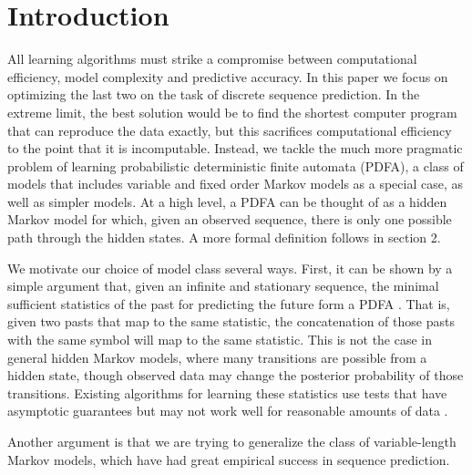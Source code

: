 \section{Introduction}
All learning algorithms must strike a compromise between computational efficiency, model complexity and predictive accuracy.  In this paper we focus on optimizing the last two on the task of discrete sequence prediction.  In the extreme limit, the best solution would be to find the shortest computer program that can reproduce the data exactly, but this sacrifices computational efficiency to the point that it is incomputable.  Instead, we tackle the much more pragmatic problem of learning probabilistic deterministic finite automata (PDFA), a class of models that includes variable and fixed order Markov models as a special case, as well as simpler models.  At a high level, a PDFA can be thought of as a hidden Markov model for which, given an observed sequence, there is only one possible path through the hidden states.  A more formal definition follows in section 2.

We motivate our choice of model class several ways.  First, it can be shown by a simple argument that, given an infinite and stationary sequence, the minimal sufficient statistics of the past for predicting the future form a PDFA \cite{Crutchfield1999}.  That is, given two pasts that map to the same statistic, the concatenation of those pasts with the same symbol will map to the same statistic.  This is not the case in general hidden Markov models, where many transitions are possible from a hidden state, though observed data may change the posterior probability of those transitions.  Existing algorithms for learning these statistics use tests that have asymptotic guarantees but may not work well for reasonable amounts of data \cite{Shalizi2004}.

Another argument is that we are trying to generalize the class of variable-length Markov models, which have had great empirical success in sequence prediction.

